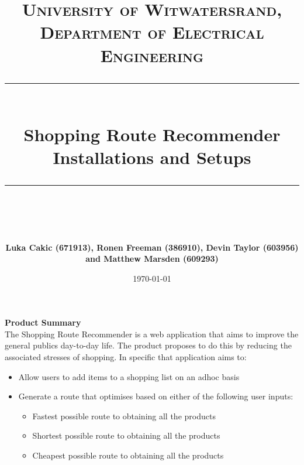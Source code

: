 \documentclass[10pt, a4paper, onecolumn]{scrartcl}
\begin{document}
	
	\newcommand{\horrule}[1]{\rule{\linewidth}{#1}}
	
	\title{\normalfont \normalsize
		\textsc{University of Witwatersrand, Department of Electrical Engineering} \\ [10pt]
		\horrule{0.5pt} \\ [10pt]
		\huge Shopping Route Recommender Installations and Setups \\
		\horrule{2pt} \\ [10pt]}
	\author{\textbf{\normalsize{Luka Cakic (671913), Ronen Freeman (386910), Devin Taylor (603956) and Matthew Marsden (609293)}} \\ [10pt]}
	\date {\normalsize \today}
	
	\maketitle
	
	
%		
	
	\textbf{Product Summary} \\
	
	The Shopping Route Recommender is a web application that aims to improve
	the general publics day-to-day life. The product proposes to do this by
	reducing the associated stresses of shopping. In specific that
	application aims to:
	
	\begin{itemize}
		\item
		Allow users to add items to a shopping list on an adhoc basis
		\item
		Generate a route that optimises based on either of the following user
		inputs:
		
		\begin{itemize}
			\item
			Fastest possible route to obtaining all the products
			\item
			Shortest possible route to obtaining all the products
			\item
			Cheapest possible route to obtaining all the products
		\end{itemize}
	\end{itemize}
	
\end{document}
